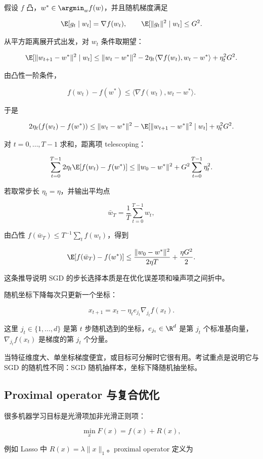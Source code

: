 假设 \(f\) 凸，\(w^*\in\argmin_w f(w)\)，并且随机梯度满足

\[
  \E[g_t\mid w_t]=\nabla f(w_t),
  \qquad
  \E[\|g_t\|^2\mid w_t]\le G^2.
\]

从平方距离展开式出发，对 \(w_t\) 条件取期望：

\[
  \E[\|w_{t+1}-w^*\|^2\mid w_t]
  \le
  \|w_t-w^*\|^2
  -
  2\eta_t\langle\nabla f(w_t),w_t-w^*\rangle
  +
  \eta_t^2G^2.
\]

由凸性一阶条件，

\[
  f(w_t)-f(w^*)
  \le
  \langle\nabla f(w_t),w_t-w^*\rangle.
\]

于是

\[
  2\eta_t(f(w_t)-f(w^*))
  \le
  \|w_t-w^*\|^2
  -
  \E[\|w_{t+1}-w^*\|^2\mid w_t]
  +
  \eta_t^2G^2.
\]

对 \(t=0,\ldots,T-1\) 求和，距离项 telescoping：

\[
  \sum_{t=0}^{T-1}
  2\eta_t\E[f(w_t)-f(w^*)]
  \le
  \|w_0-w^*\|^2
  +
  G^2\sum_{t=0}^{T-1}\eta_t^2.
\]

若取常步长 \(\eta_t=\eta\)，并输出平均点

\[
  \bar w_T=\frac1T\sum_{t=0}^{T-1}w_t,
\]

由凸性 \(f(\bar w_T)\le T^{-1}\sum_t f(w_t)\)，得到

\[
  \E[f(\bar w_T)-f(w^*)]
  \le
  \frac{\|w_0-w^*\|^2}{2\eta T}
  +
  \frac{\eta G^2}{2}.
\]

这条推导说明 SGD 的步长选择本质是在优化误差项和噪声项之间折中。

随机坐标下降每次只更新一个坐标：

\[
  x_{t+1}
  =
  x_t-\eta_t e_{j_t}\nabla_{j_t}f(x_t).
\]

这里 \(j_t\in\{1,\ldots,d\}\) 是第 \(t\) 步随机选到的坐标，\(e_{j_t}\in\R^d\) 是第 \(j_t\) 个标准基向量，\(\nabla_{j_t}f(x_t)\) 是梯度的第 \(j_t\) 个分量。

当特征维度大、单坐标梯度便宜，或目标可分解时它很有用。考试重点是说明它与 SGD 的随机性不同：SGD 随机抽样本，坐标下降随机抽坐标。

\subsection{Proximal operator 与复合优化}


很多机器学习目标是光滑项加非光滑正则项：

\[
  \min_x F(x)=f(x)+R(x),
\]

例如 Lasso 中 \(R(x)=\lambda\|x\|_1\)。proximal operator 定义为

